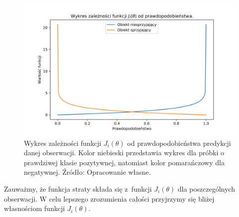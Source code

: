 \documentclass[inzynierska]{pwr_wmat_praca_dyplomowa}
\theoremstyle{plain}
\numberwithin{theorem}{chapter}
\theoremstyle{definition}
\numberwithin{theorem}{chapter}
\begin{document}
\begin{figure}[h]
	\includegraphics[width=\linewidth]{images/cross_entropy.png}
	\caption{Wykres zależności funkcji $J_i(\theta)$ od prawdopodobieństwa predykcji danej obserwacji. Kolor niebieski przedstawia wykres dla próbki o prawdziwej klasie pozytywnej, natomiast kolor pomarańczowy dla negatywnej. Źródło: Opracowanie własne.}
	\label{fig:cross-entropy-plot}
\end{figure}

Zauważmy, że funkcja straty składa się z~funkcji $J_i(\theta)$ dla poszczególnych obserwacji. W celu lepszego zrozumienia całości przyjrzymy się bliżej własnościom funkcji $J_i(\theta)$.
\end{document}
